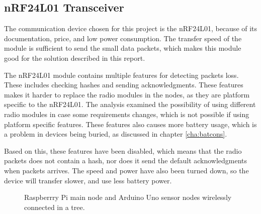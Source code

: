 \subsection*{nRF24L01 Transceiver}
The communication device chosen for this project is the nRF24L01, because of its documentation, price, and low power consumption. The transfer speed of the module is sufficient to send the small data packets, which makes this module good for the solution described in this report.

The nRF24L01 module contains multiple features for detecting packets loss. These includes checking hashes and sending acknowledgments\cite{nf24datasheet}. These features makes it harder to replace the radio modules in the nodes, as they are platform specific to the nRF24L01. The analysis examined the possibility of using different radio modules in case some requirements changes, which is not possible if using platform specific features. These features also causes more battery usage, which is a problem in devices being buried, as discussed in chapter \ref{cha:batcons}.

Based on this, these features have been disabled, which means that the radio packets does not contain a hash, nor does it send the default acknowledgments when packets arrives. The speed and power have also been turned down, so the device will transfer slower, and use less battery power.

\begin{figure}[!h]
	\centering
	\caption{Raspberrry Pi main node and Arduino Uno sensor nodes wirelessly connected in a tree.}
	\label{fig:raspbuinoTree}
\end{figure}

